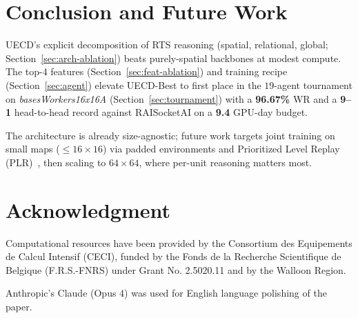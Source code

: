 \documentclass[conference]{IEEEtran}
\newif\ifanonymous
\newcommand{\code}[1]{{\ttfamily\hyphenchar\font=45\relax #1}}
\begin{document}
\section{Conclusion and Future Work}
\label{sec:conclusion}

\code{UECD}'s explicit decomposition of RTS reasoning (spatial, relational, global; Section~\ref{sec:arch-ablation}) beats purely-spatial backbones at modest compute. The top-$4$ features (Section~\ref{sec:feat-ablation}) and training recipe (Section~\ref{sec:agent}) elevate \code{UECD-Best} to first place in the $19$-agent tournament on \emph{basesWorkers16x16A} (Section~\ref{sec:tournament}) with a \textbf{96.67\%} WR and a \textbf{9--1} head-to-head record against RAISocketAI on a \textbf{9.4} GPU-day budget.

The architecture is already size-agnostic; future work targets joint training on small maps ($\leq\!16{\times}16$) via padded environments and Prioritized Level Replay (PLR)~\cite{jiangPrioritizedLevelReplay2021}, then scaling to $64{\times}64$, where per-unit reasoning matters most.

\section*{Acknowledgment}
\ifanonymous
    Computational resources have been provided by the \textit{Anonymous}, funded by the \textit{Anonymous} under Grant \textit{Anonymous}.

    Anthropic's Claude (Opus 4) was used for English language polishing of the paper.
\else
    Computational resources have been provided by the Consortium des Equipements de Calcul Intensif (CECI), funded by the Fonds de la Recherche Scientifique de Belgique (F.R.S.-FNRS) under Grant No. 2.5020.11 and by the Walloon Region.

    Anthropic's Claude (Opus 4) was used for English language polishing of the paper.
\fi

\hypersetup{urlcolor=black}
\end{document}
